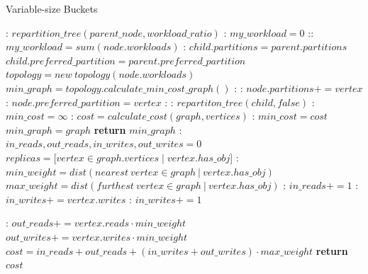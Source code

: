 \begin{algorithm}
  \caption{Variable-size Buckets}\label{alg:variable-size}
  \begin{algorithmic}[1]
    :
  \State $repartition\_tree(parent\_node, workload\_ratio)$
  \EndFunction
  :
    \State $my\_workload = 0$
    ::
      \State $my\_workload = sum(node.workloads)$
      :
      \State $child.partitions = parent.partitions$
      \State $child.preferred\_partition = parent.preferred\_partition$
      \Else
      \State $topology = new\ topology(node.workloads)$
      \State $min\_graph =  topology.calculate\_min\_cost\_graph()$
      :
        :
        \State $node.partitions += vertex$
          :
            \State $node.preferred\_partition = vertex$
          \EndIf
        \EndIf
      \EndFor
    \EndIf
    \EndIf
    :
      :
        \State $repartiton\_tree(child, false)$
        \EndFor
    \EndIf
    \EndFunction
    :
    \State $min\_cost = \infty$
      :
        \State $cost = calculate\_cost(graph, vertices)$
        :
          \State $min\_cost = cost$
          \State $min\_graph = graph$
        \EndIf
      \EndFor
    \State \textbf{return} $min\_graph$
    \EndFunction
    :
      \State $in\_reads, out\_reads, in\_writes, out\_writes = 0$
      \State $replicas = [vertex \in graph.vertices \mid vertex.has\_obj$]
      :
      \State $min\_weight = dist(nearest\ vertex \in graph\ |\  vertex.has\_obj)$
      \State $max\_weight = dist(furthest\ vertex \in graph\ |\ vertex.has\_obj)$
        :
          \State $in\_reads+= 1$
          :
          \State $in\_writes+= vertex.writes$
          \Else:
          \State  $in\_writes+= 1 $
          \EndIf
		\end{algorithmic}
	\end{algorithm}
	\begin{algorithm}
		\begin{algorithmic}[1]
        \Else:
          \State $out\_reads += vertex.reads \cdot min\_weight$
          \State $out\_writes += vertex.writes \cdot min\_weight$
        \EndIf
      \EndFor
      \State $cost = in\_reads+ out\_reads + (in\_writes+ out\_writes) \cdot max\_weight$
      \State \textbf{return} $cost$
  \EndFunction
  \end{algorithmic}
  \end{algorithm}


